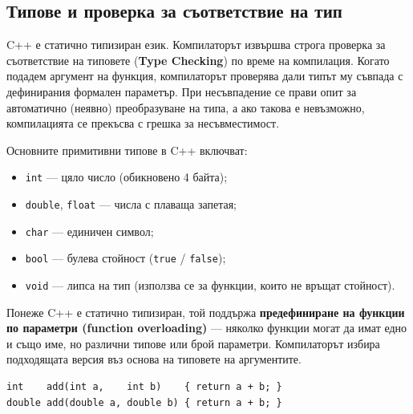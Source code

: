 \documentclass{scrartcl}
\begin{document}
\begin{FlushLeft}
\subsection{Типове и проверка за съответствие на тип}
C++ е статично типизиран език. Компилаторът извършва строга проверка за съответствие на типовете (\textbf{Type Checking}) по време на компилация. Когато подадем аргумент на функция, компилаторът проверява дали типът му съвпада с дефинирания формален параметър. При несъвпадение се прави опит за автоматично (неявно) преобразуване на типа, а ако такова е невъзможно, компилацията се прекъсва с грешка за несъвместимост.

Основните примитивни типове в C++ включват:
\begin{itemize}
    \item \texttt{int} --- цяло число (обикновено 4 байта);
    \item \texttt{double}, \texttt{float} --- числа с плаваща запетая;
    \item \texttt{char} --- единичен символ;
    \item \texttt{bool} --- булева стойност (\texttt{true} / \texttt{false});
    \item \texttt{void} --- липса на тип (използва се за функции, които не връщат стойност).
\end{itemize}
Понеже C++ е статично типизиран, той поддържа \textbf{предефиниране на функции по параметри (function overloading)} --- няколко функции могат да имат едно и също име, но различни типове или брой параметри. Компилаторът избира подходящата версия въз основа на типовете на аргументите.
\begin{lstlisting}
int    add(int a,    int b)    { return a + b; }
double add(double a, double b) { return a + b; }
\end{lstlisting}

\end{FlushLeft}
\end{document}
